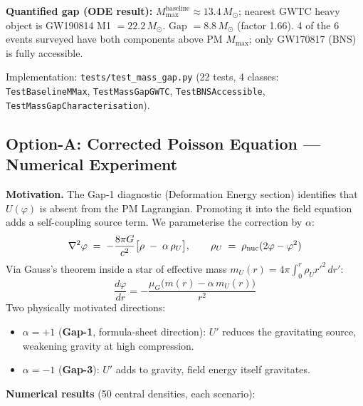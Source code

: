 \documentclass[10pt,twocolumn]{article}
\begin{document}
\noindent\textbf{Quantified gap (ODE result):} $M_\mathrm{max}^\mathrm{baseline}
\approx 13.4\,M_\odot$; nearest GWTC heavy object is GW190814 M1 $= 22.2\,M_\odot$.
Gap $= 8.8\,M_\odot$ (factor 1.66).  4 of the 6 events surveyed have both
components above PM $M_\mathrm{max}$; only GW170817 (BNS) is fully accessible.

Implementation: \texttt{tests/test\_mass\_gap.py} (22 tests, 4 classes:
\texttt{TestBaselineMMax}, \texttt{TestMassGapGWTC}, \texttt{TestBNSAccessible},
\texttt{TestMassGapCharacterisation}).

\subsection*{Option-A: Corrected Poisson Equation --- Numerical Experiment}

\noindent\textbf{Motivation.}  The Gap-1 diagnostic (Deformation Energy section)
identifies that $U(\varphi)$ is absent from the PM Lagrangian.  Promoting it into
the field equation adds a self-coupling source term.  We parameterise the
correction by $\alpha$:
\[
  \nabla^2\varphi \;=\; -\frac{8\pi G}{c^2}\bigl[\rho \;-\; \alpha\,\rho_U\bigr],
  \qquad
  \rho_U \;=\; \rho_{\rm nuc}(2\varphi - \varphi^2)
\]
Via Gauss's theorem inside a star of effective mass $m_U(r)=4\pi\int_0^r\rho_U
r'^2\,dr'$:
\[
  \frac{d\varphi}{dr} = -\frac{\mu_G\bigl(m(r)-\alpha\,m_U(r)\bigr)}{r^2}
\]
Two physically motivated directions:
\begin{itemize}
  \item $\alpha = +1$ (\textbf{Gap-1}, formula-sheet direction): $U'$ reduces the
    gravitating source, weakening gravity at high compression.
  \item $\alpha = -1$ (\textbf{Gap-3}): $U'$ adds to gravity, field energy
    itself gravitates.
\end{itemize}

\noindent\textbf{Numerical results} (50 central densities, each scenario):

\begin{center}
\end{center}
\end{document}
